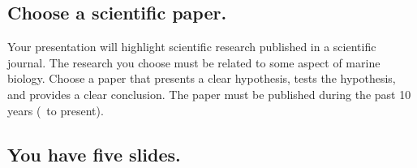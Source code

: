 \documentclass[letterpaper]{memoir}
\newcounter{decade}
\newcommand{\insertslide}[2]{%
  \framebox{\texttt{[image: \#2]}}
}
\begin{document}
%

\subsection*{Choose a scientific paper.}

Your presentation will highlight scientific research published in a scientific journal. The research you choose must be related to some aspect of marine biology. Choose a paper that presents a clear hypothesis, tests the hypothesis, and provides a clear conclusion.  The paper must be published during the past 10 years (\thedecade~to present).

%
% 
\subsection*{You have five slides.}
\end{document}
